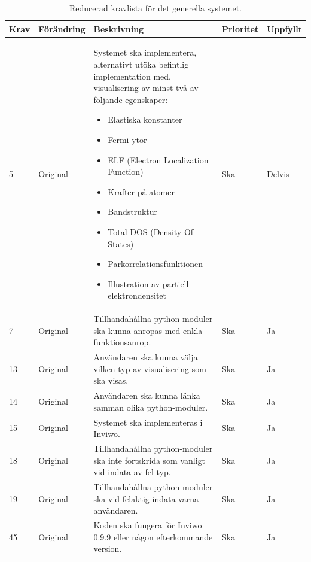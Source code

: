 \documentclass[a4paper,12pt]{article}
\begin{document}
\begin{table}[H]
\caption{Reducerad kravlista för det generella systemet.}
\begin{center}
\begin{tabular}{ |p{10mm}|p{20mm}|p{70mm}|p{15mm}|p{15mm}|}
\hline
 \textbf{Krav} & \textbf{Förändring} & \textbf{Beskrivning} & \textbf{Prioritet} & \textbf{Uppfyllt}  \\ 
\hline
 5 & Original & Systemet ska implementera, alternativt utöka befintlig implementation med, visualisering av minst två av följande egenskaper:
  \begin{itemize}
  \item Elastiska konstanter
  \item Fermi-ytor
  \item ELF (Electron Localization Function)
  \item Krafter på atomer
  \item Bandstruktur
  \item Total DOS (Density Of States)
  \item Parkorrelationsfunktionen
  \item Illustration av partiell elektrondensitet
  \end{itemize} & Ska & Delvis \\
\hline
7 & Original & Tillhandahållna python-moduler ska kunna anropas med enkla funktionsanrop. & Ska & Ja \\
\hline
13 & Original & Användaren ska kunna välja vilken typ av visualisering som ska visas. & Ska & Ja \\
\hline
14 & Original & Användaren ska kunna länka samman olika python-moduler. & Ska & Ja \\
\hline
15 & Original & Systemet ska implementeras i Inviwo. & Ska & Ja \\
\hline
18 & Original & Tillhandahållna python-moduler ska inte fortskrida som vanligt vid indata av fel typ. & Ska & Ja \\
\hline
19 & Original & Tillhandahållna python-moduler ska vid felaktig indata varna användaren. & Ska & Ja \\
\hline
45 & Original & Koden ska fungera för Inviwo 0.9.9 eller någon efterkommande version. & Ska & Ja \\
\hline


\end{tabular}
\end{center}
\end{table}
\end{document}
